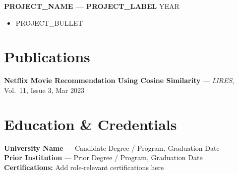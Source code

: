 \documentclass[letterpaper,9pt]{article}
\begin{document}
	\textbf{PROJECT_NAME --- PROJECT_LABEL} \hfill YEAR
	\begin{itemize}
		\item PROJECT_BULLET
	\end{itemize}


	\section*{Publications}
	\textbf{Netflix Movie Recommendation Using Cosine Similarity} --- \textit{IJRES}, Vol.\ 11, Issue 3, Mar 2023


	\section*{Education \& Credentials}
	\textbf{University Name} --- Candidate Degree / Program, Graduation Date \\
	\textbf{Prior Institution} --- Prior Degree / Program, Graduation Date \\
	\textbf{Certifications:} Add role-relevant certifications here
\end{document}
